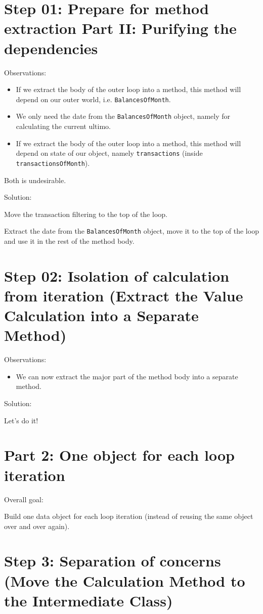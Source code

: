 \documentclass[a4paper,fleqn,titlepage,11pt]{article}
\begin{document}
\section{Step 01: Prepare for method extraction Part II: Purifying the dependencies}

Observations:
\begin{itemize}
\item If we extract the body of the outer loop into a method, this method will depend on our outer world, i.e. \texttt{BalancesOfMonth}.
\item We only need the date from the \texttt{BalancesOfMonth} object, namely for calculating the current ultimo.
\item If we extract the body of the outer loop into a method, this method will depend on state of our object, namely \texttt{transactions} (inside \texttt{transactionsOfMonth}).
\end{itemize}

Both is undesirable.

Solution:

Move the transaction filtering to the top of the loop.

Extract the date from the \texttt{BalancesOfMonth} object, move it to the top of the loop and use it in the rest of the method body.


\section{Step 02: Isolation of calculation from iteration (Extract the Value Calculation into a Separate Method)}

Observations:
\begin{itemize}
\item We can now extract the major part of the method body into a separate method.
\end{itemize}

Solution:

Let's do it!

\section{Part 2: One object for each loop iteration}

Overall goal:

Build one data object for each loop iteration (instead of reusing the same object over and over again).


\section{Step 3: Separation of concerns (Move the Calculation Method to the Intermediate Class)}
\end{document}
